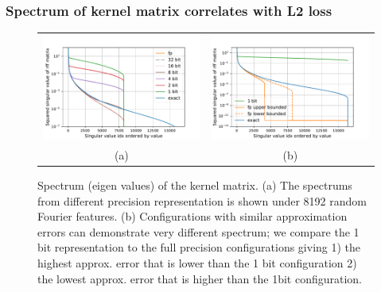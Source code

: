 \subsubsection{Spectrum of kernel matrix correlates with L2 loss}
\label{subsubsec:bump_spectrum}
\begin{figure}
	\centering
	\begin{tabular}{c c}
		\includegraphics[width=.45\linewidth]{figures/spectrum_n_rff_8192.pdf} &
		\includegraphics[width=.45\linewidth]{figures/different_spectrum_with_same_kernel_approx_error_log.pdf} \\
		(a) & (b) %
	\end{tabular}
	\caption{Spectrum (eigen values) of the kernel matrix. (a) The spectrums from different precision representation is shown under 8192 random Fourier features. (b) Configurations with similar approximation errors can demonstrate very different spectrum; we compare the 1 bit representation to the full precision configurations giving 1) the highest approx. error that is lower than the 1 bit configuration 2) the lowest approx. error that is higher than the 1bit configuration.}
	\label{fig:spectrums}
\end{figure}

